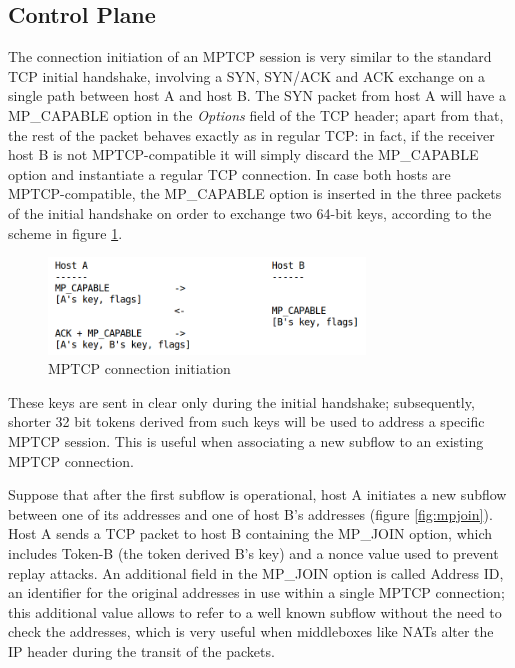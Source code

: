 \subsection{Control Plane}
The connection initiation of an MPTCP session is very similar to the standard TCP initial handshake, involving a SYN, SYN/ACK and ACK exchange on a single path between host A and host B. The SYN packet from host A will have a MP\_CAPABLE option in the \textit{Options} field of the TCP header; apart from that, the rest of the packet behaves exactly as in regular TCP: in fact, if the receiver host B is not MPTCP-compatible it will simply discard the MP\_CAPABLE option and instantiate a regular TCP connection.
In case both hosts are MPTCP-compatible, the MP\_CAPABLE option is inserted in the three packets of the initial handshake on order to exchange two 64-bit keys, according to the scheme in figure \ref{fig:mpcapable}.

\begin{figure}[!htb]
\centering
\includegraphics[width=0.75\textwidth]{images/mpcapable}
\caption{MPTCP connection initiation}
\label{fig:mpcapable}
\end{figure}

These keys are sent in clear only during the initial handshake; subsequently, shorter 32 bit tokens derived from such keys will be used to address a specific MPTCP session. This is useful when associating a new subflow to an existing MPTCP connection.

\vspace{5mm}
Suppose that after the first subflow is operational, host A initiates a new subflow between one of its addresses and one of host B's addresses (figure \ref{fig:mpjoin}). Host A sends a TCP packet to host B containing the MP\_JOIN option, which includes Token-B (the token derived B's key) and a nonce value used to prevent replay attacks. An additional field in the MP\_JOIN option is called Address ID, an identifier for the original addresses in use within a single MPTCP connection; this additional value allows to refer to a well known subflow without the need to check the addresses, which is very useful when middleboxes like NATs alter the IP header during the transit of the packets.

